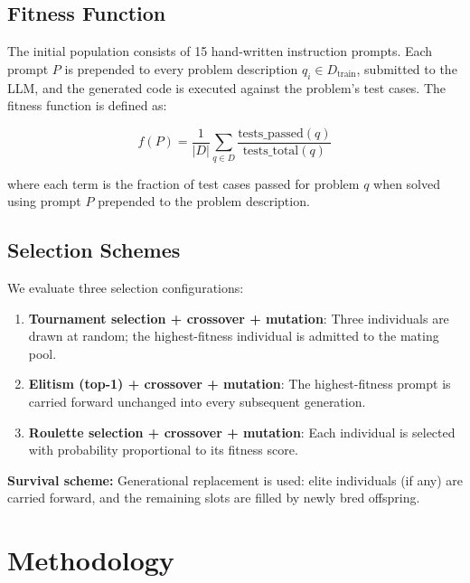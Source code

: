 \documentclass[conference]{IEEEtran}
\begin{document}
\subsection{Fitness Function}

The initial population consists of 15 hand-written instruction prompts. Each prompt $P$
is prepended to every problem description $q_i \in D_\text{train}$, submitted to the LLM,
and the generated code is executed against the problem's test cases. The fitness function
is defined as:

\begin{equation}
f(P) = \frac{1}{|D|} \sum_{q \in D} \frac{\text{tests\_passed}(q)}{\text{tests\_total}(q)}
\label{eq:fitness}
\end{equation}

\noindent where each term is the fraction of test cases passed for problem $q$
when solved using prompt $P$ prepended to the problem description.

\subsection{Selection Schemes}

We evaluate three selection configurations:

\begin{enumerate}
    \item \textbf{Tournament selection + crossover + mutation}: Three individuals are drawn
    at random; the highest-fitness individual is admitted to the mating pool.

    \item \textbf{Elitism (top-1) + crossover + mutation}: The highest-fitness
    prompt is carried forward unchanged into every subsequent generation.

    \item \textbf{Roulette selection + crossover + mutation}: Each individual is selected
    with probability proportional to its fitness score.
\end{enumerate}

\textbf{Survival scheme:} Generational replacement is used: elite individuals (if any)
are carried forward, and the remaining slots are filled by newly bred offspring.

\section{Methodology}
\label{sec:method}
\end{document}
